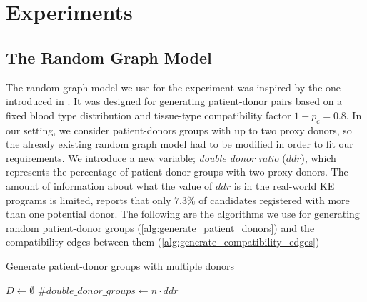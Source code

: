 \chapter{Experiments}
\label{cha:Experiments}


\section{The Random Graph Model}
The random graph model we use for the experiment was inspired by the one introduced in \cite{toulis2011random}. It was designed for generating patient-donor pairs based on a fixed blood type distribution and tissue-type compatibility factor $1 - p_c = 0.8$. In our setting, we consider patient-donors groups with up to two proxy donors, so the already existing random graph model had to be modified in order to fit our requirements. We introduce a new variable; \textit{double donor ratio} ($ddr$), which represents the percentage of patient-donor groups with two proxy donors. The amount of information about what the value of $ddr$ is in the real-world KE programs is limited, \cite{holscher2018kidney} reports that only $7.3\%$ of candidates registered with more than one potential donor. The following are the algorithms we use for generating random patient-donor groups (\autoref{alg:generate_patient_donors}) and the compatibility edges between them (\autoref{alg:generate_compatibility_edges})

\begin{algorithm}
    \caption{Generate patient-donor groups with multiple donors}
    \label{alg:generate_patient_donors}


    $D \gets \emptyset$\;
    $\#double\_donor\_groups \gets n \cdot ddr$\;
\end{algorithm}


